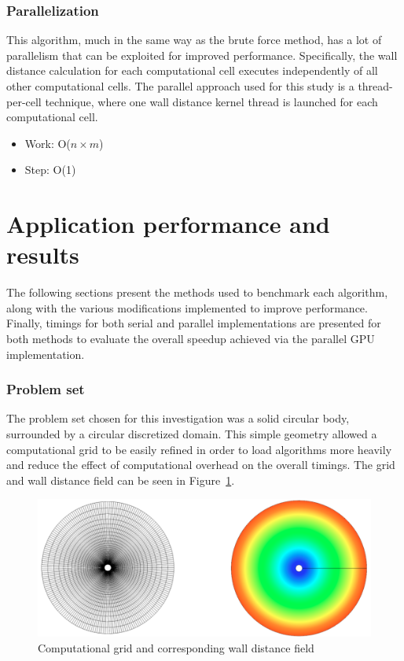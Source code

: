 \documentclass[]{aiaa-tc}%
\begin{document}
\subsubsection{Parallelization}
This algorithm, much in the same way as the brute force method, has a
lot of parallelism that can be exploited for improved
performance. Specifically, the wall distance calculation for each
computational cell executes independently of all other computational
cells. The parallel approach used for this study is a thread-per-cell
technique, where one wall distance kernel thread is launched for each
computational cell.


\begin{itemize}
\item Work: O($n \times m$)
\item Step: O(1)
\end{itemize}


\section{Application performance and results}
The following sections present the methods used to benchmark each
algorithm, along with the various modifications implemented to improve
performance. Finally, timings for both serial and parallel
implementations are presented for both methods to evaluate the overall
speedup achieved via the parallel GPU implementation.


\subsubsection{Problem set}
The problem set chosen for this investigation was a solid circular
body, surrounded by a circular discretized domain. This simple
geometry allowed a computational grid to be easily refined in order to
load algorithms more heavily and reduce the effect of computational
overhead on the overall timings. The grid and wall distance field can
be seen in Figure~\ref{f:circle}.

\begin{figure}
  \centering
  \includegraphics[width=0.7\linewidth]{figures/grid/circle_grid}
  \caption{Computational grid and corresponding wall distance field}
  \label{f:circle}
\end{figure}
\end{document}
